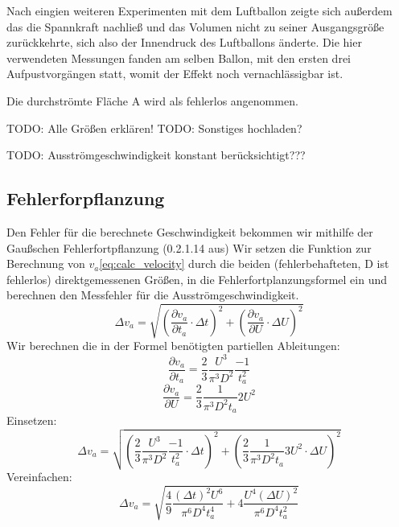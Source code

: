 \documentclass{article}
\begin{document}
            Nach eingien weiteren Experimenten mit dem Luftballon zeigte sich außerdem das die Spannkraft nachließ und das Volumen
            nicht zu seiner Ausgangsgröße zurückkehrte, sich also der Innendruck des Luftballons änderte.
            Die hier verwendeten Messungen fanden am selben Ballon, mit den ersten drei Aufpustvorgängen statt, womit der Effekt noch vernachlässigbar ist.

            Die durchströmte Fläche A wird als fehlerlos angenommen.

        TODO: Alle Größen erklären!
        TODO: Sonstiges hochladen?

        TODO: Ausströmgeschwindigkeit konstant berücksichtigt???

        \subsection{Fehlerforpflanzung}
            Den Fehler für die berechnete Geschwindigkeit bekommen wir mithilfe der Gaußschen Fehlerfortpflanzung (0.2.1.14 aus\cite{AnleitungPraktikum})
            Wir setzen die Funktion zur Berechnung von \(v_a\)\ref{eq:calc_velocity} durch die beiden (fehlerbehafteten, D ist fehlerlos)
            direktgemessenen Größen, in die Fehlerfortplanzungsformel ein und berechnen den Messfehler für die Ausströmgeschwindigkeit. 
            \begin{equation}
                \Delta v_a = \sqrt{ {\left( \frac{ \partial v_a }{ \partial t_a } \cdot \Delta t \right)}^2 + {\left( \frac{ \partial v_a }{ \partial U } \cdot \Delta U \right)}^2 }
            \end{equation}
            Wir berechnen die in der Formel benötigten partiellen Ableitungen:
            \begin{equation}
                 \frac{\partial v_a}{ \partial t_a} = \frac{2}{3} \frac{U^3}{\pi^3 D^2} \frac{-1}{t_a^2}
            \end{equation}
            \begin{equation}
                \frac{\partial v_a}{ \partial U} = \frac{2}{3} \frac{1}{\pi^3 D^2 t_a} 2 U^2
            \end{equation}
            Einsetzen:
            \begin{equation}
                \Delta v_a = \sqrt{ {\left( \frac{2}{3} \frac{U^3}{\pi^3 D^2} \frac{-1}{t_a^2} \cdot \Delta t \right) }^2 
                + {\left( \frac{2}{3} \frac{1}{\pi^3 D^2 t_a} 3 U^2 \cdot \Delta U \right)}^2 }
            \end{equation}
            Vereinfachen:
            \begin{equation} \label{eq:fehler}
                \Delta v_a = \sqrt{ \frac{4}{9} \frac{ {(\Delta t)}^2 U^6}{\pi^6 D^4 t_a^4} + 4 \frac{U^4 {(\Delta U)}^2}{\pi^6 D^4 t_a^2}}
            \end{equation}
\end{document}
